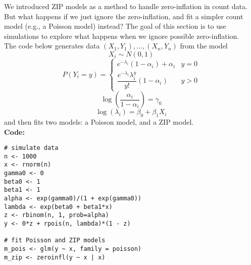 \documentclass[11pt]{article}
\begin{document}
We introduced ZIP models as a method to handle zero-inflation in count data. But what happens if we just ignore the zero-inflation, and fit a simpler count model (e.g., a Poisson model) instead? The goal of this section is to use simulations to explore what happens when we ignore possible zero-inflation.\\

\noindent The code below generates data $(X_1, Y_1),...,(X_n, Y_n)$ from the model
$$X_i \sim N(0, 1)$$
$$P(Y_i = y) = \begin{cases} e^{-\lambda_i}(1 - \alpha_i) + \alpha_i & y = 0 \\ \dfrac{e^{-\lambda_i} \lambda_i^y}{y!}(1 - \alpha_i) & y > 0 \end{cases}$$
$$\log \left( \dfrac{\alpha_i}{1 - \alpha_i} \right) = \gamma_0$$
$$\log(\lambda_i) = \beta_0 + \beta_1 X_i$$
and then fits two models: a Poisson model, and a ZIP model.\\

\noindent \textbf{Code:}
\begin{verbatim}
# simulate data
n <- 1000
x <- rnorm(n)
gamma0 <- 0
beta0 <- 1
beta1 <- 1
alpha <- exp(gamma0)/(1 + exp(gamma0))
lambda <- exp(beta0 + beta1*x)
z <- rbinom(n, 1, prob=alpha)
y <- 0*z + rpois(n, lambda)*(1 - z)

# fit Poisson and ZIP models
m_pois <- glm(y ~ x, family = poisson)
m_zip <- zeroinfl(y ~ x | x)
\end{verbatim}
\end{document}
